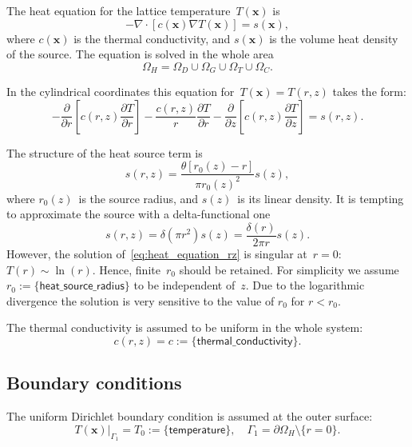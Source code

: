 \documentclass[10pt]{article}
\renewcommand{\vec}[1]{\mathbf{#1}}
\newcommand{\vx}{\vec{x}}
\begin{document}
The heat equation for the lattice temperature~$T(\vx)$ is
\begin{equation}
	-\nabla \cdot [ c(\vx) \nabla T(\vx) ] = s(\vx),
\end{equation}
where $c(\vx)$ is the thermal conductivity, and $s(\vx)$ is the volume heat
density of the source. The equation is solved in the whole area
\begin{equation}
	\Omega_H = \Omega_D \cup \Omega_G \cup \Omega_T \cup \Omega_C.
\end{equation}

In the cylindrical coordinates this equation for~$T(\vx) = T(r, z)$ takes
the form:
\begin{equation}
	\label{eq:heat_equation_rz}
	- \frac{\partial}{\partial r} \left[ c(r, z) \frac{\partial T}{\partial r} \right]
	- \frac{c(r, z)}{r} \frac{\partial T}{\partial r}
	- \frac{\partial}{\partial z} \left[ c(r, z) \frac{\partial T}{\partial z} \right]
	= s(r, z).
\end{equation}

The structure of the heat source term is
\begin{equation}
	s(r, z) = \frac{\theta [ r_0(z) - r ]}{\pi r_0(z)^2} s(z),
\end{equation}
where $r_0(z)$~is the source radius, and $s(z)$~is its linear density. It is
tempting to approximate the source with a delta-functional one
\begin{equation}
	s(r, z) = \delta (\pi r^2) s(z) = \frac{\delta(r)}{2\pi r} s(z).
\end{equation}
However, the solution of~\eqref{eq:heat_equation_rz} is singular at~$r = 0$:
$T(r) \sim \ln(r)$. Hence, finite~$r_0$ should be retained. For simplicity we
assume $r_0 := \{ \mathsf{heat\_source\_radius} \}$ to be independent of~$z$.
Due to the logarithmic divergence the solution is very sensitive to the value
of $r_0$ for $r < r_0$.

The thermal conductivity is assumed to be uniform in the whole system:
\begin{equation}
	c(r, z) = c := \{ \mathsf{thermal\_conductivity} \}.
\end{equation}

\subsection{Boundary conditions}

The uniform Dirichlet boundary condition is assumed at the outer surface:
\begin{equation}
	T(\vx)\vert_{\Gamma_1} = T_0 := \{ \mathsf{temperature} \}, \quad
	\Gamma_1 = \partial \Omega_H \setminus \{ r = 0 \}.
\end{equation}
\end{document}
